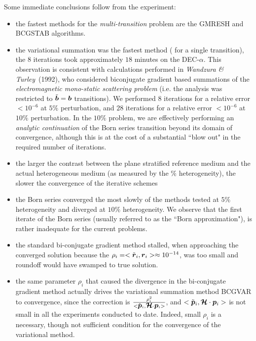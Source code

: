 Some immediate conclusions follow from the experiment:
\begin{itemize}

\item the fastest methods for the {\em multi-transition\/} problem
are the {\sc GMRESH\/} and {\sc BCGSTAB\/} algorithms.

\item the variational summation was the fastest method 
( for a single transition), the $8$ iterations took approximately $18$ 
minutes on the DEC-$\alpha$.
This observation is consistent with calculations performed in {\em 
Wandzura \& Turley\/}~(1992), who considered biconjugate gradient 
based summations of the {\em electromagnetic mono-static scattering 
problem\/} (i.e. the analysis was restricted to $\tilde{\mbox{\boldmath$\mit b$\unboldmath}} = {\mbox{\boldmath$\mit b$\unboldmath}}$ transitions).  
We performed $8$ iterations for a relative error $<10^{-6}$ at $5\%$
perturbation, and $28$ iterations for a relative error $<10^{-6}$ at $10\%$
perturbation. In the $10\%$ problem, we are effectively performing an 
{\em analytic continuation\/} of the Born series transition beyond its 
domain of 
convergence, although this is at the cost of a substantial ``blow out"
in the required number of iterations.




\item the larger the contrast between the plane stratified 
reference medium and the actual heterogeneous medium (as measured by the 
$\%$ heterogeneity), the slower the 
convergence of the iterative schemes

\item the Born series converged the most slowly of the methods tested at 
$5\%$
heterogeneity and diverged at $10 \%$ heterogeneity. We observe that the 
first iterate of the Born series (usually referred to as the ``Born 
approximation"), is rather inadequate for the current problems. 



\item the standard bi-conjugate gradient method stalled, when approaching
the converged solution because the
 $\rho_{i}=<\tilde{\mbox{\boldmath$\mit r$\unboldmath}}{}_{i},{\mbox{\boldmath$\mit r$\unboldmath}}{}_{i}> \approx 10^{-14}$, was 
too small
and roundoff would have swamped to true solution.

\item the same parameter $\rho_i$ that caused the divergence in the 
bi-conjugate gradient method actually drives the variational summation 
method {\sc BCGVAR\/} to convergence, since the correction is 
$\frac{\rho^{2}_{i}}
{<\tilde{\mbox{\boldmath$\mit p$\unboldmath}}{}_{i},{\mbox{\boldmath$\cal H$\unboldmath}}\cdot{\mbox{\boldmath$\mit p$\unboldmath}}{}_{i}>}$, and
$<\tilde{\mbox{\boldmath$\mit p$\unboldmath}}{}_{i},{\mbox{\boldmath$\cal H$\unboldmath}}\cdot{\mbox{\boldmath$\mit p$\unboldmath}}{}_{i}>$ is not small in all 
the 
experiments conducted to date.
Indeed, small $\rho_{i}$ is a necessary, though not 
sufficient condition for the convergence of the variational method.


\end{itemize}
